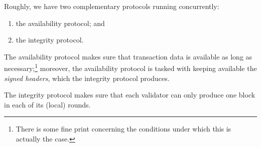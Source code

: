 \documentclass[dvipsnames]{article}
\theoremstyle{definition}
\begin{document}
Roughly, we have two complementary protocols running concurrently:
 \begin{enumerate}
 \item the availability protocol; and
 \item the integrity protocol.
 \end{enumerate}
 The availability protocol makes sure
 that transaction data is available
 as long as necessary;\footnote{%
   There is some fine print concerning
   the conditions under which this is actually the case.
 }
 moreover,
 the availability protocol
 is tasked with keeping available
 the \emph{signed headers},
 which the integrity protocol produces.

 The integrity protocol makes sure that
 each validator can only produce one block in each of its (local) rounds.
\end{document}
